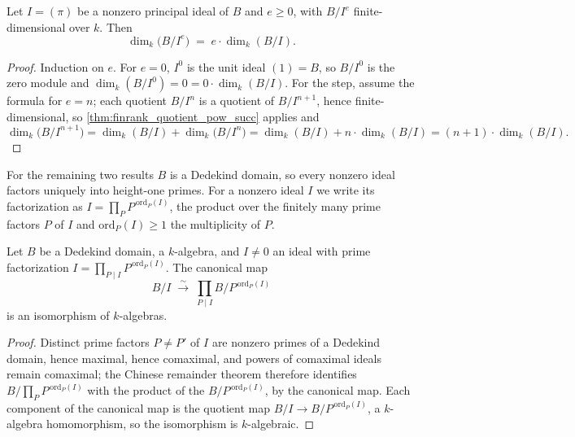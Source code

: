 \begin{theorem}
  \label{thm:finrank_quotient_span_pow}
  \leanok
  Let \(I = (\pi)\) be a nonzero principal ideal of \(B\) and \(e \ge 0\), with \(B/I^e\)
  finite-dimensional over \(k\). Then
  \[
    \dim_k\bigl(B/I^e\bigr) \;=\; e \cdot \dim_k(B/I) .
  \]
\end{theorem}
\begin{proof}
  \leanok
  Induction on \(e\). For \(e = 0\), \(I^0\) is the unit ideal \((1) = B\), so \(B/I^0\) is the
  zero module and \(\dim_k(B/I^0) = 0 = 0 \cdot \dim_k(B/I)\). For the step, assume the formula
  for \(e = n\); each quotient \(B/I^n\) is a quotient of \(B/I^{n+1}\), hence
  finite-dimensional, so \ref{thm:finrank_quotient_pow_succ} applies and
  \[
    \dim_k\bigl(B/I^{n+1}\bigr) = \dim_k(B/I) + \dim_k\bigl(B/I^n\bigr)
      = \dim_k(B/I) + n \cdot \dim_k(B/I) = (n+1) \cdot \dim_k(B/I) .
  \]
\end{proof}

For the remaining two results \(B\) is a Dedekind domain, so every nonzero ideal factors
uniquely into height-one primes. For a nonzero ideal \(I\) we write its factorization as
\(I = \prod_P P^{\,\mathrm{ord}_P(I)}\), the product over the finitely many prime factors \(P\)
of \(I\) and \(\mathrm{ord}_P(I) \ge 1\) the multiplicity of \(P\).

\begin{definition}
  \label{def:quotAlgEquivPiFactors}
  \leanok
  Let \(B\) be a Dedekind domain, a \(k\)-algebra, and \(I \neq 0\) an ideal with prime
  factorization \(I = \prod_{P \mid I} P^{\,\mathrm{ord}_P(I)}\). The canonical map
  \[
    B/I \;\xrightarrow{\ \sim\ }\; \prod_{P \mid I} B/P^{\,\mathrm{ord}_P(I)}
  \]
  is an isomorphism of \(k\)-algebras.
\end{definition}
\begin{proof}
  \leanok
  Distinct prime factors \(P \neq P'\) of \(I\) are nonzero primes of a Dedekind domain,
  hence maximal, hence comaximal, and powers of comaximal ideals remain comaximal; the
  Chinese remainder theorem therefore identifies \(B/\prod_P P^{\,\mathrm{ord}_P(I)}\)
  with the product of the \(B/P^{\,\mathrm{ord}_P(I)}\), by the canonical map. Each
  component of the canonical map is the quotient map
  \(B/I \to B/P^{\,\mathrm{ord}_P(I)}\), a \(k\)-algebra homomorphism, so the
  isomorphism is \(k\)-algebraic.
\end{proof}

